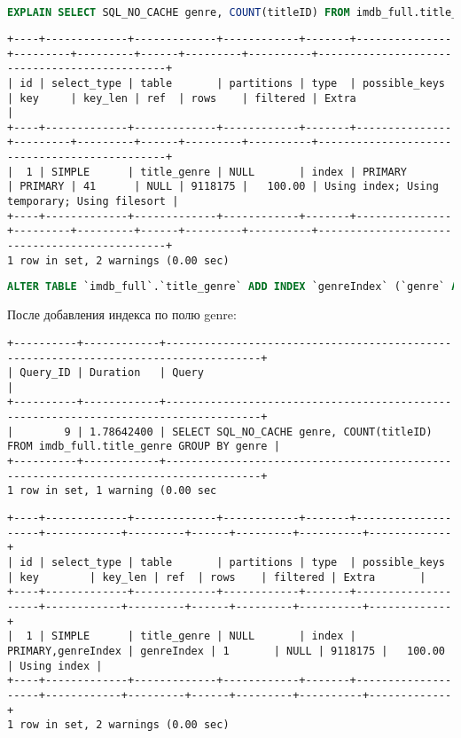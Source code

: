 \documentclass[12pt,a4paper]{article}
\begin{document}
\begin{lstlisting}[language=SQL]
EXPLAIN SELECT SQL_NO_CACHE genre, COUNT(titleID) FROM imdb_full.title_genre GROUP BY genre;
\end{lstlisting}

\begin{lstlisting}[basicstyle = \tiny\ttfamily, columns = fixed]
+----+-------------+-------------+------------+-------+---------------+---------+---------+------+---------+----------+----------------------------------------------+
| id | select_type | table       | partitions | type  | possible_keys | key     | key_len | ref  | rows    | filtered | Extra                                        |
+----+-------------+-------------+------------+-------+---------------+---------+---------+------+---------+----------+----------------------------------------------+
|  1 | SIMPLE      | title_genre | NULL       | index | PRIMARY       | PRIMARY | 41      | NULL | 9118175 |   100.00 | Using index; Using temporary; Using filesort |
+----+-------------+-------------+------------+-------+---------------+---------+---------+------+---------+----------+----------------------------------------------+
1 row in set, 2 warnings (0.00 sec)
\end{lstlisting}

\begin{lstlisting}[language=SQL]
ALTER TABLE `imdb_full`.`title_genre` ADD INDEX `genreIndex` (`genre` ASC);
\end{lstlisting}

После добавления индекса по полю genre:
\begin{lstlisting}[basicstyle = \tiny\ttfamily, columns = fixed]
+----------+------------+-------------------------------------------------------------------------------------+
| Query_ID | Duration   | Query                                                                               |
+----------+------------+-------------------------------------------------------------------------------------+
|        9 | 1.78642400 | SELECT SQL_NO_CACHE genre, COUNT(titleID) FROM imdb_full.title_genre GROUP BY genre |
+----------+------------+-------------------------------------------------------------------------------------+
1 row in set, 1 warning (0.00 sec
\end{lstlisting}

\begin{lstlisting}[basicstyle = \tiny\ttfamily, columns = fixed]
+----+-------------+-------------+------------+-------+--------------------+------------+---------+------+---------+----------+-------------+
| id | select_type | table       | partitions | type  | possible_keys      | key        | key_len | ref  | rows    | filtered | Extra       |
+----+-------------+-------------+------------+-------+--------------------+------------+---------+------+---------+----------+-------------+
|  1 | SIMPLE      | title_genre | NULL       | index | PRIMARY,genreIndex | genreIndex | 1       | NULL | 9118175 |   100.00 | Using index |
+----+-------------+-------------+------------+-------+--------------------+------------+---------+------+---------+----------+-------------+
1 row in set, 2 warnings (0.00 sec)
\end{lstlisting}
\end{document}
